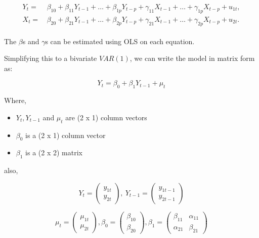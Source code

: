 \documentclass[12pt,]{article}
\providecommand{\tightlist}{%
  \setlength{\itemsep}{0pt}\setlength{\parskip}{0pt}}
\begin{document}
\begin{equation}
\label{eqn:vector-regression-ts}
\begin{split}
\begin{aligned}
  Y_t =& \, \beta_{10} + \beta_{11} Y_{t-1} + \dots + \beta_{1p} Y_{t-p} + \gamma_{11} X_{t-1} + \dots + \gamma_{1p} X_{t-p} + u_{1t}, \\
  X_t =& \, \beta_{20} + \beta_{21} Y_{t-1} + \dots + \beta_{2p} Y_{t-p} + \gamma_{21} X_{t-1} + \dots + \gamma_{2p} X_{t-p} + u_{2t}.
\end{aligned}
\end{split}
\end{equation}

The \(\beta\)s and \(\gamma\)s can be estimated using OLS on each equation.

Simplifying this to a bivariate \(VAR(1)\), we can write the model in matrix form as:

\begin{equation}
\label{eqn:matix-var1-model}
Y_t = \beta_0 + \beta_1 Y_{t-1} + \mu_t
\end{equation}

Where,

\begin{itemize}
\tightlist
\item
  \(Y_t, Y_{t-1}\) and \(\mu_t\) are (2 x 1) column vectors
\item
  \(\beta_0\) is a (2 x 1) column vector
\item
  \(\beta_1\) is a (2 x 2) matrix
\end{itemize}

also,

\[
Y_t = 
\begin{pmatrix} 
y_{1t} \\
y_{2t}
\end{pmatrix},\ 
Y_{t-1} = 
\begin{pmatrix} 
y_{1t-1} \\
y_{2t-1}
\end{pmatrix}
\]

\[
\mu_t = 
\begin{pmatrix} 
\mu_{1t} \\
\mu_{2t}
\end{pmatrix},
\beta_{0} = 
\begin{pmatrix} 
\beta_{10} \\
\beta_{20}
\end{pmatrix},
\beta_{1} = 
\begin{pmatrix} 
\beta_{11} & \alpha_{11} \\
\alpha_{21} & \beta_{21}
\end{pmatrix}
\]
\end{document}
